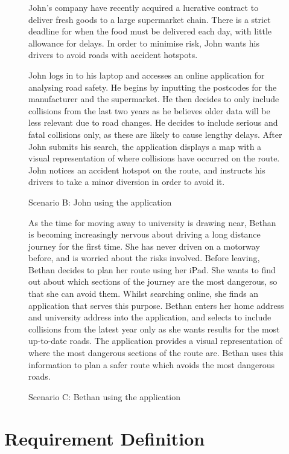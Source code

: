 \documentclass[authoryearcitations]{UoYCSproject}
\begin{document}
\begin{figure}
	\begin{framed}
 		John's company have recently acquired a lucrative contract to deliver fresh goods to a large supermarket chain. There is a strict deadline for when the food must be delivered each day, with little allowance for delays. In order to minimise risk, John wants his drivers to avoid roads with accident hotspots.
 		
 		John logs in to his laptop and accesses an online application for analysing road safety. He begins by inputting the postcodes for the manufacturer and the supermarket. He then decides to only include collisions from the last two years as he believes older data will be less relevant due to road changes. He decides to include serious and fatal collisions only, as these are likely to cause lengthy delays. After John submits his search, the application displays a map with a visual representation of where collisions have occurred on the route. John notices an accident hotspot on the route, and instructs his drivers to take a minor diversion in order to avoid it.
  	\end{framed}
  \caption{Scenario B: John using the application}
  \label{fig:scenarioB}
\end{figure}

\begin{figure}
	\begin{framed}
		As the time for moving away to university is drawing near, Bethan is becoming increasingly nervous about driving a long distance journey for the first time. She has never driven on a motorway before, and is worried about the risks involved. Before leaving, Bethan decides to plan her route using her iPad. She wants to find out about which sections of the journey are the most dangerous, so that she can avoid them. Whilst searching online, she finds an application that serves this purpose.
		Bethan enters her home address and university address into the application, and selects to include collisions from the latest year only as she wants results for the most up-to-date roads. The application provides a visual representation of where the most dangerous sections of the route are. Bethan uses this information to plan a safer route which avoids the most dangerous roads.
  	\end{framed}
  \caption{Scenario C: Bethan using the application}
  \label{fig:scenarioC}
\end{figure}

\section{Requirement Definition}
\end{document}
